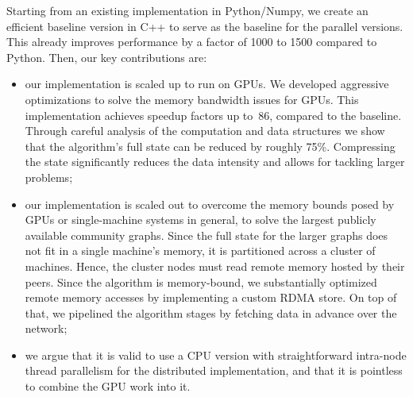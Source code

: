 Starting from an existing implementation in Python/Numpy, we create an efficient
baseline version in C++ to serve as the baseline for the parallel versions.
This already improves performance by a factor of 1000 to 1500 compared to
Python. Then, our key contributions are:
\begin{itemize}
\item
our implementation is scaled up to run on GPUs.
We developed aggressive optimizations to solve the memory bandwidth issues for
GPUs. This implementation achieves speedup factors up to~86,
compared to the baseline.
%
Through careful analysis of the computation and data structures we show that
the algorithm's full state can be reduced by roughly 75\%. Compressing the
state significantly reduces the data intensity and allows for tackling larger
problems; %

\item
our implementation is scaled out to overcome the memory bounds posed by GPUs or
single-machine systems in general, to solve the largest publicly available
community graphs. %
Since the full state for the larger graphs does not fit in a
single machine's memory, it is partitioned across a cluster
of machines. Hence, the cluster nodes must read
remote memory hosted by their peers. Since the algorithm is memory-bound, we
substantially optimized remote memory accesses by implementing
a custom RDMA store.
On top of that, we pipelined the algorithm stages by fetching
data in advance over the network;
\begin{comment} Finally, the algorithm's computation
is effectively distributed across the cluster nodes and parallelized further
within each node by exploiting their multi-core CPUs.
\end{comment}

\item we argue that it is valid to use a CPU version with straightforward
intra-node thread parallelism for the distributed implementation, and
that it is pointless to combine the GPU work into it.

\end{itemize}

